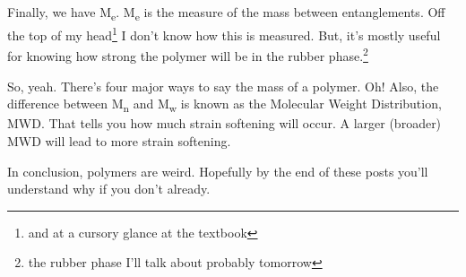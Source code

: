 \documentclass[12pt]{article}[titlepage]
\newcommand{\1}{\={a}}
\newcommand{\2}{\={e}}
\newcommand{\3}{\={\i}}
\newcommand{\4}{\=o}
\newcommand{\5}{\=u}
\newcommand{\6}{\={A}}
\newcommand{\sub}[1]{\textsubscript{#1}}
\renewcommand{\,}{\textsuperscript{,}}
\begin{document}
Finally, we have M\sub{e}.
M\sub{e} is the measure of the mass between entanglements.
Off the top of my head\footnote{and at a cursory glance at the textbook} I don't know how this is measured.
But, it's mostly useful for knowing how strong the polymer will be in the rubber phase.\footnote{the rubber phase I'll talk about probably tomorrow}

So, yeah.
There's four major ways to say the mass of a polymer.
Oh! 
Also, the difference between M\sub{n} and M\sub{w} is known as the Molecular Weight Distribution, MWD.
That tells you how much strain softening will occur.
A larger (broader) MWD will lead to more strain softening.

In conclusion, polymers are weird.
Hopefully by the end of these posts you'll understand why if you don't already.
\end{document}
